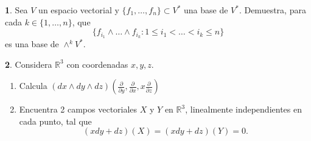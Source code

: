\documentclass[12pt,a4paper]{report}
\theoremstyle{definition}
\newtheorem{ex}{}
\newcommand{\pd}[1]{\frac{\partial}{\partial #1}} %
\newcommand{\RR}{\ensuremath{\mathbb R}}
\begin{document}
 \begin{ex} Sea $V$ un espacio vectorial y $\{f_1,\dots,f_n\}\subset V^*$ una base de $V^*$. Demuestra,  para cada $k\in\{1,\dots,n\}$, que
 $$\{f_{i_1}\wedge\dots\wedge f_{i_k}: 1\le i_1 <\dots<i_k\le n\}$$
 es una base de $\wedge^k V^*$.
\end{ex}

 \begin{ex}
 Considera $\RR^3$ con coordenadas $x,y,z$. 
 \begin{enumerate}
 
\item Calcula $(dx \wedge dy \wedge dz) (\pd{y},\pd{x}, x \pd{z})$
\item Encuentra 2 campos vectoriales $X$ y $Y$ en $\RR^3$, linealmente independientes en cada punto, tal que
$$(xdy+dz)(X)=(xdy+dz)(Y)=0.$$
\end{enumerate}
\end{ex}
 
\end{document}
